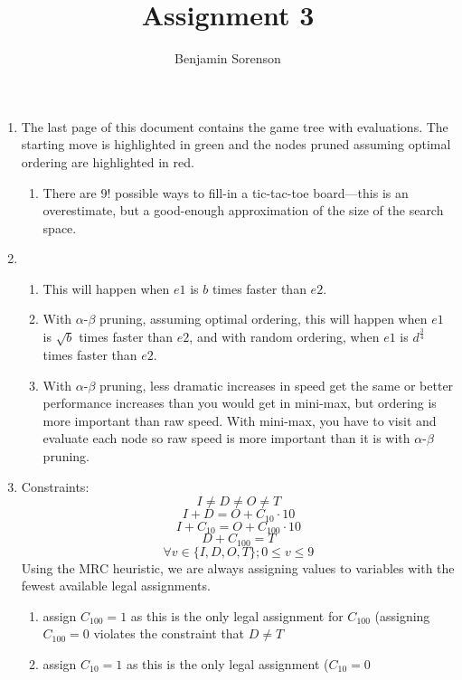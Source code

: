 \documentclass[11pt]{article}
\begin{document}
\author{Benjamin Sorenson} \title{Assignment 3}
\maketitle
\begin{enumerate}[label=\bfseries Question \arabic*:]
\item %
  The last page of this document contains the game tree with
  evaluations.  The starting move is highlighted in green and the
  nodes pruned assuming optimal ordering are highlighted in red.
  \begin{enumerate}
  \item There are \(9!\)
    possible ways to fill-in a tic-tac-toe board---this is an
    overestimate, but a good-enough approximation of the size of the
    search space.
  \end{enumerate}
\item %
  \begin{enumerate}
  \item This will happen when \(e1\)
    is \(b\) times faster than \(e2\).
  \item With \(\alpha\)-\(\beta\)
    pruning, assuming optimal ordering, this will happen when \(e1\)
    is \(\sqrt{b}\)
    times faster than \(e2\),
    and with random ordering, when \(e1\)
    is \(d^{\frac{3}{4}}\) times faster than \(e2\).
  \item With \(\alpha\)-\(\beta\)
    pruning, less dramatic increases in speed get the same or better
    performance increases than you would get in mini-max, but ordering
    is more important than raw speed.  With mini-max, you have to
    visit and evaluate each node so raw speed is more important than
    it is with \(\alpha\)-\(\beta\) pruning.
  \end{enumerate}
\item %
  Constraints:
  \[I \ne D \ne O \ne T\]
  \[I + D = O + C_{10} \cdot 10\]
  \[I + C_{10} = O + C_{100} \cdot 10\]
  \[D + C_{100} = T\]
  \[\forall v \in \{I, D, O, T\}; 0 \le v \le 9\]
  Using the MRC heuristic, we are always assigning values to variables
  with the fewest available legal assignments.
  \begin{enumerate}[label=\bfseries Depth \arabic*:]
  \item assign \(C_{100} = 1\)
    as this is the only legal assignment for \(C_{100}\)
    (assigning \(C_{100}=0\) violates the constraint that \(D \ne T\)
  \item assign \(C_{10} = 1\)
    as this is the only legal assignment (\(C_{10} = 0\)

\end{enumerate}
\end{enumerate}
\end{document}

